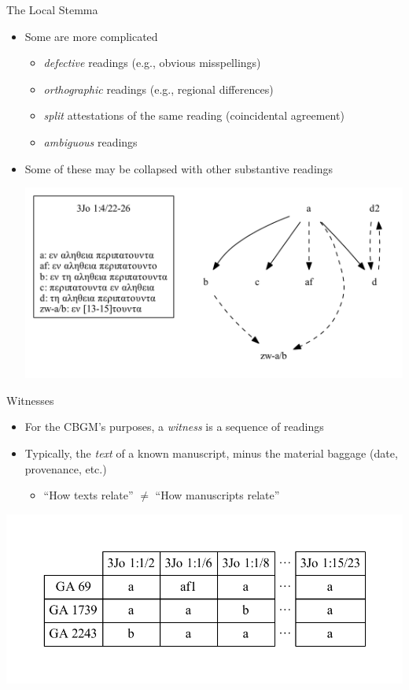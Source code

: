\documentclass[10pt]{beamer}
\begin{document}
	\begin{frame}{The Local Stemma}
		\begin{itemize}
			\item Some are more complicated
			\begin{itemize}
				\item \emph{defective} readings (e.g., obvious misspellings)
				\item \emph{orthographic} readings (e.g., regional differences)
				\item \emph{split} attestations of the same reading (coincidental agreement)
				\item \emph{ambiguous} readings
			\end{itemize}
			\item Some of these may be collapsed with other substantive readings
			\begin{center}
				\includegraphics[scale=0.5]{../graphics/B25K1V4U22-26-local-stemma-ignore-defective-ignore-ambiguous-merge-splits.pdf}
			\end{center}
		\end{itemize}
	\end{frame}
	\begin{frame}{Witnesses}\label{slide:witnesses}
		\begin{itemize}
			\item For the CBGM's purposes, a \emph{witness} is a sequence of readings
			\item Typically, the \emph{text} of a known manuscript, minus the material baggage (date, provenance, etc.)
			\begin{itemize}
				\item ``How texts relate'' $\neq$ ``How manuscripts relate''
			\end{itemize}
		\end{itemize}
		\begin{center}
			\includegraphics[scale=0.5]{../graphics/witnesses.pdf}
		\end{center}
	\end{frame}
\end{document}
